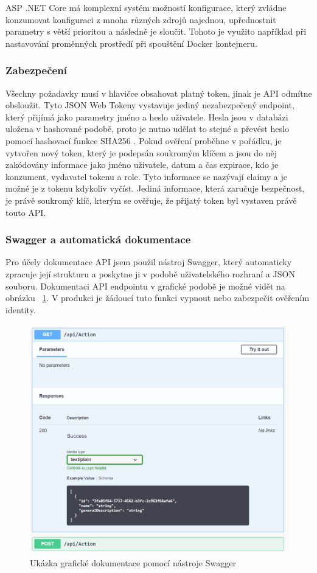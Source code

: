 \documentclass[
  glossaries,
]{kidiplom}
\begin{document}
ASP .NET Core má komplexní systém možností konfigurace, který zvládne konzumovat konfiguraci z mnoha různých zdrojů najednou, upřednostnit parametry s větší prioritou a následně je sloučit. Tohoto je využito například při nastavování proměnných prostředí při spouštění Docker kontejneru.

\subsubsection{Zabezpečení}
\label{sec:security}
Všechny požadavky musí v hlavičce obsahovat platný token, jinak je API odmítne obsloužit. Tyto JSON Web Tokeny vystavuje jediný nezabezpečený endpoint, který přijímá jako parametry jméno a heslo uživatele. Hesla jsou v databázi uložena v hashované podobě, proto je nutno udělat to stejné a převést heslo pomocí hashovací funkce SHA256 \cite{12}. Pokud ověření proběhne v pořádku, je vytvořen nový token, který je podepsán soukromým klíčem a jsou do něj zakódovány informace jako jméno uživatele, datum a čas expirace, kdo je konzument, vydavatel tokenu a role. Tyto informace se nazývají claimy a je možné je z tokenu kdykoliv vyčíst. Jediná informace, která zaručuje bezpečnost, je právě soukromý klíč, kterým se ověřuje, že přijatý token byl vystaven právě touto API.

\subsubsection{Swagger a automatická dokumentace}
Pro účely dokumentace API jsem použil nástroj Swagger, který automaticky zpracuje její strukturu a poskytne ji v podobě uživatelského rozhraní a JSON souboru. Dokumentaci API endpointu v grafické podobě je možné vidět na obrázku ~\ref{fig:Swagger}. V produkci je žádoucí tuto funkci vypnout nebo zabezpečit ověřením identity.

\begin{figure}[H]
  	\centering
 	 \includegraphics[width=14cm,height=10cm,keepaspectratio]{Swagger_UI}
 	 \caption{Ukázka grafické dokumentace pomocí nástroje Swagger}
 	 \label{fig:Swagger}
\end{figure}
\end{document}
